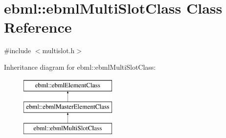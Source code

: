 \hypertarget{classebml_1_1ebmlMultiSlotClass}{}\section{ebml\+:\+:ebml\+Multi\+Slot\+Class Class Reference}
\label{classebml_1_1ebmlMultiSlotClass}


{\ttfamily \#include $<$multislot.\+h$>$}

Inheritance diagram for ebml\+:\+:ebml\+Multi\+Slot\+Class\+:\begin{figure}[H]
\begin{center}
\leavevmode
\includegraphics[height=3.000000cm]{classebml_1_1ebmlMultiSlotClass}
\end{center}
\end{figure}
